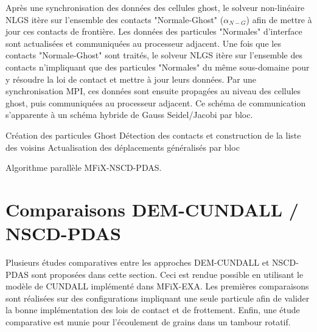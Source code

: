 Après une synchronisation des données des cellules ghost, le solveur non-linéaire NLGS itère sur l'ensemble des contacts "Normale-Ghost" ($\alpha_{N-G}$) afin de mettre à jour ces contacts de frontière. Les données des particules "Normales" d'interface sont actualisées et communiquées au processeur adjacent. Une fois que les contacts "Normale-Ghost" sont traités, le solveur NLGS itère sur l'ensemble des contacts n'impliquant que des particules "Normales" du même sous-domaine pour y résoudre la loi de contact et mettre à jour leurs données. Par une synchronisation MPI, ces données sont ensuite propagées au niveau des cellules ghost, puis communiquées au processeur adjacent. Ce schéma de communication s'apparente à un schéma hybride de Gauss Seidel/Jacobi par bloc.\\

\begin{algorithm}[H]
  \SetAlgoLined
 
  Création des particules Ghost\;
  Détection des contacts et construction de la liste des voisins\;
  Actualisation des déplacements généralisés par bloc\;
  \caption{Algorithme parallèle MFiX-NSCD-PDAS.}
\end{algorithm}

\section{Comparaisons DEM-CUNDALL / NSCD-PDAS}

Plusieurs études comparatives entre les approches DEM-CUNDALL et NSCD-PDAS sont proposées dans cette section. Ceci est rendue possible en utilisant le modèle de CUNDALL implémenté dans MFiX-EXA. Les premières comparaisons sont réalisées sur des configurations impliquant une seule particule afin de valider la bonne implémentation des lois de contact et de frottement. Enfin, une étude comparative est munie pour l'écoulement de grains dans un tambour rotatif.

